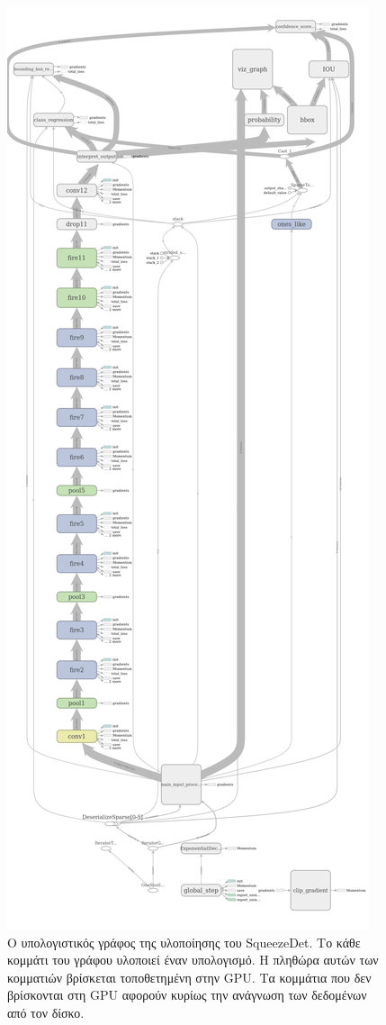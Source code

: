 \begin{figure}
    \centering
    \includegraphics[width=\textwidth,height=\textheight]{figures/architecture/comp_graph.pdf}
    \caption[Ο υπολογιστικός γράφος της υλοποίησης]{Ο υπολογιστικός γράφος της υλοποίησης του SqueezeDet. Το κάθε κομμάτι του γράφου υλοποιεί έναν υπολογισμό. Η πληθώρα αυτών των κομματιών βρίσκεται τοποθετημένη στην GPU. Τα κομμάτια που δεν βρίσκονται στη GPU αφορούν κυρίως την ανάγνωση των δεδομένων από τον δίσκο.}
    \label{fig:computation_graph}
\end{figure}